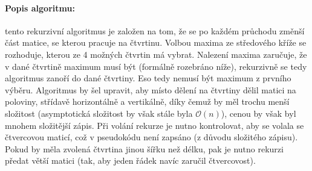 \documentclass[12pt]{iv003}
\begin{document}
\paragraph{Popis algoritmu:} tento rekurzivní algoritmus je založen na tom, že se po každém průchodu změnší část matice, se kterou pracuje na čtvrtinu. Volbou maxima ze středového kříže se rozhoduje, kterou ze 4 možných čtvrtin má vybrat. Nalezení maxima zaručuje, že v dané čtvrtině maximum musí být (formálně rozebráno níže), rekurzivně se tedy algoritmus zanoří do dané čtvrtiny. Eso tedy nemusí být maximum z prvního výběru. Algoritmus by šel upravit, aby místo dělení na čtvrtiny dělil matici na poloviny, střídavě horizontálně a vertikálně, díky čemuž by měl trochu menší složitost (asymptotická složitost by však stále byla $\mathcal{O}(n)$), cenou by však byl mnohem složitější zápis. Při volání rekurze je nutno kontrolovat, aby se volala se čtvercovou maticí, což v pseudokódu není zapsáno (z důvodu složitého zápisu). Pokud by měla zvolená čtvrtina jinou šířku než délku, pak je nutno rekurzi předat větší matici (tak, aby jeden řádek navíc zaručil čtvercovost).
\end{document}

